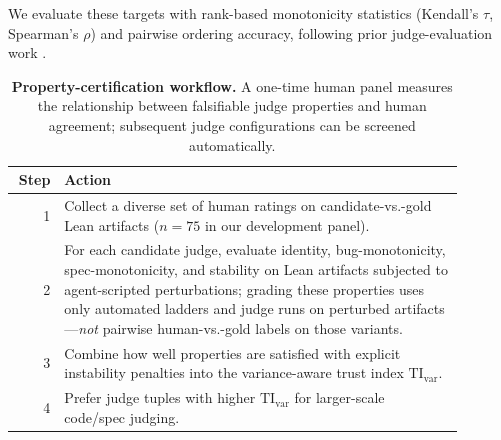 \documentclass{article}
\begin{document}
We evaluate these targets with rank-based monotonicity statistics (Kendall's $\tau$, Spearman's $\rho$) and pairwise ordering accuracy, following prior judge-evaluation work \citep{TongZhang2024CodeJudge,Zhuo2024ICEScore}.

\begin{table}[t]
  \centering
  \small
  \begin{tabular}{@{}r@{\kern 7pt}>{\raggedright\arraybackslash} p{0.89\linewidth}@{}}
    \toprule
    \textbf{Step} & \textbf{Action}                                                                                                                                                                                                                                                                                      \\
    \midrule
    1             &
    Collect a diverse set of human ratings on candidate-vs.-gold Lean artifacts (\(n{=}75\) in our development panel).                                                                                                                                                                                                         \\
    2             &
    For each candidate judge, evaluate identity, bug-monotonicity, spec-monotonicity, and stability on Lean artifacts subjected to agent-scripted perturbations; grading these properties uses only automated ladders and judge runs on perturbed artifacts—\emph{not} pairwise human-vs.-gold labels on those variants. \\
    3             &
    Combine how well properties are satisfied with explicit instability penalties into the variance-aware trust index \(\mathrm{TI}_{\mathrm{var}}\).                                                                                                                                                                    \\
    4             &
    Prefer judge tuples with higher \(\mathrm{TI}_{\mathrm{var}}\) for larger-scale code/spec judging.                                                                                                                                                                                                    \\
    \bottomrule
  \end{tabular}
  \caption{\textbf{Property-certification workflow.}
    A one-time human panel measures the relationship between falsifiable judge properties
    and human agreement; subsequent judge configurations can be screened automatically.}
  \label{tab:protocol_workflow}
\end{table}
\end{document}
